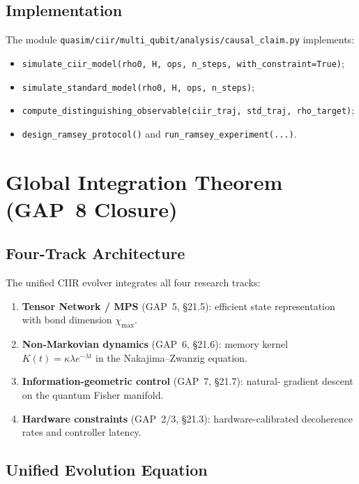 \subsection{Implementation}

The module \texttt{quasim/ciir/multi\_qubit/analysis/causal\_claim.py}
implements:
\begin{itemize}
  \item \texttt{simulate\_ciir\_model(rho0, H, ops, n\_steps, with\_constraint=True)};
  \item \texttt{simulate\_standard\_model(rho0, H, ops, n\_steps)};
  \item \texttt{compute\_distinguishing\_observable(ciir\_traj, std\_traj, rho\_target)};
  \item \texttt{design\_ramsey\_protocol()} and \texttt{run\_ramsey\_experiment(...)}.
\end{itemize}

\section{Global Integration Theorem (GAP~8 Closure)}
\label{sec:ch22-unified}

\subsection{Four-Track Architecture}

The unified CIIR evolver integrates all four research tracks:
\begin{enumerate}
  \item \textbf{Tensor Network / MPS} (GAP~5, \S21.5): efficient state
    representation with bond dimension $\chi_{\max}$.
  \item \textbf{Non-Markovian dynamics} (GAP~6, \S21.6): memory kernel
    $K(t) = \kappa\lambda e^{-\lambda t}$ in the Nakajima--Zwanzig equation.
  \item \textbf{Information-geometric control} (GAP~7, \S21.7): natural-
    gradient descent on the quantum Fisher manifold.
  \item \textbf{Hardware constraints} (GAP~2/3, \S21.3): hardware-calibrated
    decoherence rates and controller latency.
\end{enumerate}

\subsection{Unified Evolution Equation}

